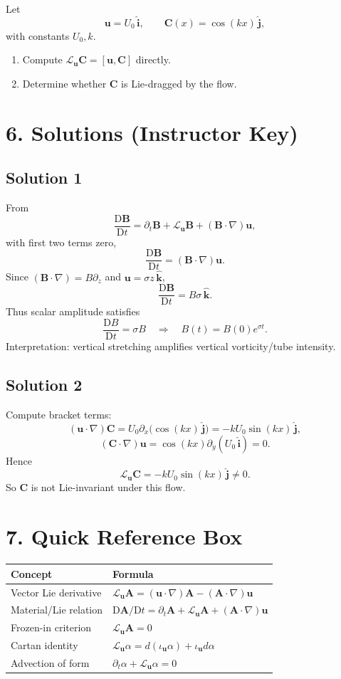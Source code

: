 \documentclass[11pt]{article}
\newcommand{\Lie}{\mathcal{L}}
\newcommand{\DD}{\mathrm{D}}
\newcommand{\ii}{\hat{\mathbf{i}}}
\newcommand{\jj}{\hat{\mathbf{j}}}
\newcommand{\kk}{\hat{\mathbf{k}}}
\begin{document}
Let
\[
\mathbf{u}=U_0\,\ii,
\qquad
\mathbf{C}(x)=\cos(kx)\,\jj,
\]
with constants $U_0,k$.

\begin{enumerate}[label=\arabic*.]
  \item Compute $\Lie_{\mathbf{u}}\mathbf{C}=[\mathbf{u},\mathbf{C}]$ directly.
  \item Determine whether $\mathbf{C}$ is Lie-dragged by the flow.
\end{enumerate}

\section*{6. Solutions (Instructor Key)}

\subsection*{Solution 1}

From
\[
\frac{\DD\mathbf{B}}{\DD t} = \partial_t\mathbf{B} + \Lie_{\mathbf{u}}\mathbf{B} + (\mathbf{B}\cdot\nabla)\mathbf{u},
\]
with first two terms zero,
\[
\frac{\DD\mathbf{B}}{\DD t}=(\mathbf{B}\cdot\nabla)\mathbf{u}.
\]
Since $(\mathbf{B}\cdot\nabla)=B\partial_z$ and $\mathbf{u}=\sigma z\,\kk$,
\[
\frac{\DD\mathbf{B}}{\DD t}=B\sigma\,\kk.
\]
Thus scalar amplitude satisfies
\[
\frac{\DD B}{\DD t}=\sigma B
\quad\Rightarrow\quad
B(t)=B(0)e^{\sigma t}.
\]
Interpretation: vertical stretching amplifies vertical vorticity/tube intensity.

\subsection*{Solution 2}

Compute bracket terms:
\[
(\mathbf{u}\cdot\nabla)\mathbf{C}
=U_0\partial_x\big(\cos(kx)\,\jj\big)
=-kU_0\sin(kx)\,\jj,
\]
\[
(\mathbf{C}\cdot\nabla)\mathbf{u}
=\cos(kx)\partial_y(U_0\,\ii)=0.
\]
Hence
\[
\boxed{\Lie_{\mathbf{u}}\mathbf{C}=-kU_0\sin(kx)\,\jj\neq 0.}
\]
So $\mathbf{C}$ is not Lie-invariant under this flow.

\section*{7. Quick Reference Box}

\begin{tabular}{@{}ll@{}}
\toprule
Concept & Formula \\
\midrule
Vector Lie derivative & $\Lie_{\mathbf{u}}\mathbf{A}=(\mathbf{u}\cdot\nabla)\mathbf{A}-(\mathbf{A}\cdot\nabla)\mathbf{u}$ \\
Material/Lie relation & $\DD\mathbf{A}/\DD t=\partial_t\mathbf{A}+\Lie_{\mathbf{u}}\mathbf{A}+(\mathbf{A}\cdot\nabla)\mathbf{u}$ \\
Frozen-in criterion & $\Lie_{\mathbf{u}}\mathbf{A}=0$ \\
Cartan identity & $\Lie_{\mathbf{u}}\alpha=d(\iota_{\mathbf{u}}\alpha)+\iota_{\mathbf{u}}d\alpha$ \\
Advection of form & $\partial_t\alpha+\Lie_{\mathbf{u}}\alpha=0$ \\
\bottomrule
\end{tabular}
\end{document}
